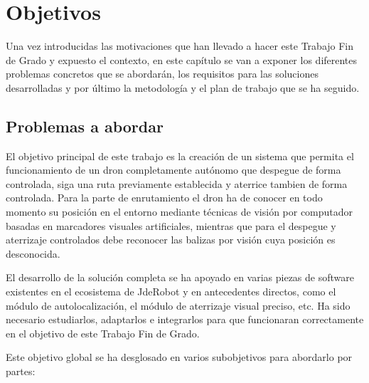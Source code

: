 \chapter{Objetivos}\label{cap.objetivos}
\hspace{1cm} Una vez introducidas las motivaciones que han llevado a hacer este Trabajo Fin de Grado y expuesto el contexto, en este capítulo se van a exponer los diferentes problemas concretos que se abordarán, los requisitos para las soluciones desarrolladas y por último la metodología y el plan de trabajo que se ha seguido. 


\section{Problemas a abordar}
\hspace{1cm} El objetivo principal de este trabajo es la creación de un sistema  que permita el funcionamiento de un dron completamente autónomo que despegue de forma controlada, siga una ruta previamente establecida y aterrice tambien de forma controlada. Para la parte de enrutamiento el dron ha de conocer en todo momento su posición en el entorno mediante técnicas de visión por computador basadas en marcadores visuales artificiales, mientras que para el despegue y aterrizaje controlados debe reconocer las balizas por visión cuya posición es desconocida.

\hspace{1cm} El desarrollo de la solución completa se ha apoyado en varias piezas de software existentes en el ecosistema de JdeRobot y en antecedentes directos, como el módulo de autolocalización, el módulo de aterrizaje visual preciso, etc. Ha sido necesario estudiarlos, adaptarlos e integrarlos para que funcionaran correctamente en el objetivo de este Trabajo Fin de Grado.

\hspace{1cm} Este objetivo global se ha desglosado en varios subobjetivos para abordarlo por partes:

